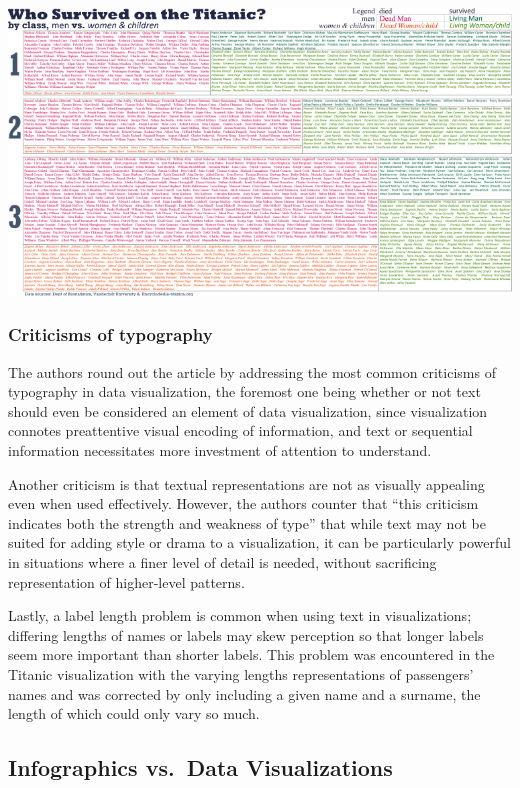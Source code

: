 \documentclass[]{book}
\begin{document}
\includegraphics{images/TypographicTitanic.jpg}

\hypertarget{criticisms-of-typography}{%
\subsubsection{Criticisms of typography}\label{criticisms-of-typography}}

The authors round out the article by addressing the most common criticisms of typography in data visualization, the foremost one being whether or not text should even be considered an element of data visualization, since visualization connotes preattentive visual encoding of information, and text or sequential information necessitates more investment of attention to understand.

Another criticism is that textual representations are not as visually appealing even when used effectively. However, the authors counter that ``this criticism indicates both the strength and weakness of type'' that while text may not be suited for adding style or drama to a visualization, it can be particularly powerful in situations where a finer level of detail is needed, without sacrificing representation of higher-level patterns.

Lastly, a label length problem is common when using text in visualizations; differing lengths of names or labels may skew perception so that longer labels seem more important than shorter labels. This problem was encountered in the Titanic visualization with the varying lengths representations of passengers' names and was corrected by only including a given name and a surname, the length of which could only vary so much.

\hypertarget{infographics-vs.data-visualizations}{%
\subsection{Infographics vs.~Data Visualizations}\label{infographics-vs.data-visualizations}}
\end{document}
